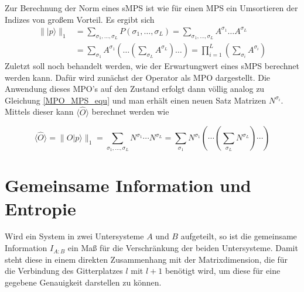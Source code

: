 \documentclass[10pt,a4paper]{report}
\newcommand{\SumIndex}{\sigma_1,\ldots,\sigma_L}
\begin{document}
Zur Berechnung der Norm eines sMPS ist wie für einen MPS ein Umsortieren der Indizes von großem Vorteil. Es ergibt sich
\begin{equation}
\begin{split}
\parallel|p\rangle\parallel_1&=\sum_{\SumIndex}P(\SumIndex)=\sum_{\SumIndex}A^{\sigma_1}\ldots A^{\sigma_L}\\
&=\sum_{\sigma_1}A^{\sigma_1}(\ldots(\sum_{\sigma_L}A^{\sigma_L})\ldots)=\prod_{i=1}^L(\sum_{\sigma_i}A^{\sigma_i})
\end{split}
\end{equation}
Zuletzt soll noch behandelt werden, wie der Erwartungwert eines sMPS berechnet werden kann. Dafür wird zunächst der Operator als MPO dargestellt. Die Anwendung dieses MPO's auf den Zustand erfolgt dann völlig analog zu Gleichung \ref{MPO_MPS_equ} und man erhält einen neuen Satz Matrizen $N^{\sigma_i}$. Mittels dieser kann $\langle\hat{O}\rangle$ berechnet werden wie

\begin{equation}
\langle\hat{O}\rangle=\lVert\hat{O}|p\rangle\rVert_1=\sum_{\SumIndex}N^{\sigma_1}\cdots N^{\sigma_L}=\sum_{\sigma_1}N^{\sigma_1}\left( \cdots\left( \sum_{\sigma_L}N^{\sigma_L}\right)\cdots\right)
\end{equation}

\section{Gemeinsame Information und Entropie}\label{information_entropy}
Wird ein System in zwei Untersysteme $A$ und $B$ aufgeteilt, so ist die gemeinsame Information $I_{A:B}$ ein Maß für die Verschränkung der beiden Untersysteme. Damit steht diese in einem direkten Zusammenhang mit der Matrixdimension, die für die Verbindung des Gitterplatzes $l$ mit $l+1$ benötigt wird, um diese für eine gegebene Genauigkeit darstellen zu können.\\
\end{document}
